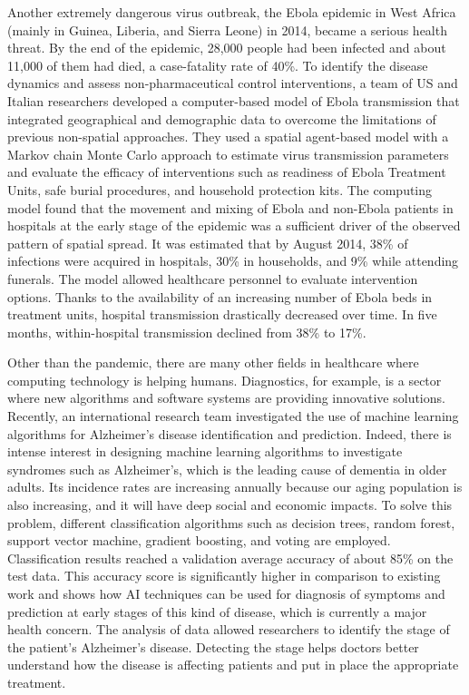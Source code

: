 Another extremely dangerous virus outbreak, the Ebola epidemic in West Africa (mainly in Guinea, Liberia, and Sierra Leone) in 2014, became a serious health threat. By the end of the epidemic, 28,000 people had been infected and about 11,000 of them had died, a case-fatality rate of 40\%. To identify the disease dynamics and assess non-pharmaceutical control interventions, a team of US and Italian researchers developed a computer-based model of Ebola transmission that integrated geographical and demographic data to overcome the limitations of previous non-spatial approaches. They used a spatial agent-based model with a Markov chain Monte Carlo approach to estimate virus transmission parameters and evaluate the efficacy of interventions such as readiness of Ebola Treatment Units, safe burial procedures, and household protection kits. The computing model found that the movement and mixing of Ebola and non-Ebola patients in hospitals at the early stage of the epidemic was a sufficient driver of the observed pattern of spatial spread. It was estimated that by August 2014, 38\% of infections were acquired in hospitals, 30\% in households, and 9\% while attending funerals. The model allowed healthcare personnel to evaluate intervention options. Thanks to the availability of an increasing number of Ebola beds in treatment units, hospital transmission drastically decreased over time. In five months, within-hospital transmission declined\vadjust{\vspace*{-16pt}\pagebreak} from 38\% to 17\%.

Other than the pandemic, there are many other fields in healthcare where computing technology is helping humans. Diagnostics, for example, is a sector where new algorithms and software systems are providing innovative solutions. Recently, an international research team investigated the use of machine learning algorithms for Alzheimer's disease identification and prediction. Indeed, there is intense interest in designing machine learning algorithms to investigate syndromes such as Alzheimer's, which is the leading cause of dementia in older adults. Its incidence rates are increasing annually because our aging population is also increasing, and it will have deep social and economic impacts. To solve this problem, different classification algorithms such as decision trees, random forest, support vector machine, gradient boosting, and voting are employed. Classification results reached a validation average accuracy of about 85\% on the test data. This accuracy score is significantly higher in comparison to existing work and shows how AI techniques can be used for diagnosis of symptoms and prediction at early stages of this kind of disease, which is currently a major health concern. The analysis of data allowed researchers to identify the stage of the patient's Alzheimer's disease. Detecting the stage helps doctors better understand how the disease is affecting patients and put in place the appropriate treatment.

